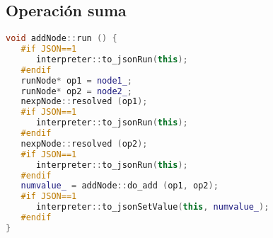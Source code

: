 \subsection{Operación suma}
\begin{lstlisting}[language=cpp]
void addNode::run () {
   #if JSON==1
      interpreter::to_jsonRun(this);
   #endif         
   runNode* op1 = node1_;
   runNode* op2 = node2_;
   nexpNode::resolved (op1);
   #if JSON==1
      interpreter::to_jsonRun(this);
   #endif      
   nexpNode::resolved (op2);
   #if JSON==1
      interpreter::to_jsonRun(this);
   #endif         
   numvalue_ = addNode::do_add (op1, op2);
   #if JSON==1
      interpreter::to_jsonSetValue(this, numvalue_);
   #endif
}
\end{lstlisting}
